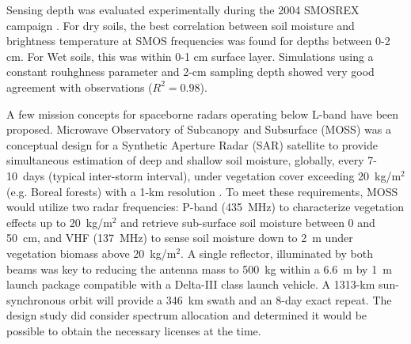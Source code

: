 \documentclass[draftcls,onecolumn]{IEEEtran}  %
\begin{document}
Sensing depth was evaluated experimentally during the 2004 SMOSREX campaign \cite{Escorihuela2010}. 
For dry soils, the best correlation between soil moisture and brightness temperature at SMOS frequencies was found for depths between 0-2 cm.  
For Wet soils, this was within 0-1 cm surface layer.  
Simulations using a constant rouhghness parameter and 2-cm sampling depth showed very good agreement with observations ($R^2=0.98$). 


A few mission concepts for spaceborne radars operating below L-band have been proposed. 
Microwave Observatory of Subcanopy and Subsurface (MOSS)  was a conceptual design for a Synthetic Aperture Radar (SAR) satellite
to provide simultaneous estimation of deep %
and shallow %
soil moisture, globally, every 7-10~days (typical inter-storm interval), 
under vegetation cover exceeding 20~kg/m$^2$ (e.g. Boreal forests) with a 1-km resolution \cite{Moghaddam2003d}. 
To meet these requirements,  MOSS  would utilize two radar frequencies:
 P-band (435~MHz)  to characterize vegetation effects up to 20~kg/m$^2$ and retrieve sub-surface soil moisture between  0 and 50~cm,  and 
VHF (137~MHz) to sense soil moisture down to 2~m under vegetation biomass above 20~kg/m$^2$.
A single reflector, illuminated by both beams was key to reducing the antenna  mass to 500~kg within a 
6.6~m by 1~m launch package compatible with a Delta-III class launch vehicle. 
A 1313-km sun-synchronous orbit will provide a 346~km swath and an 8-day exact repeat.
The design study did consider spectrum allocation and determined it would be possible to obtain the necessary licenses at the time. 
\end{document}
